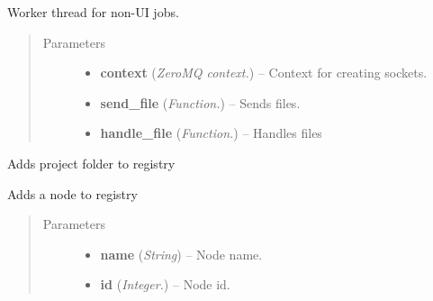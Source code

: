 \documentclass[letterpaper,10pt,english]{sphinxmanual}
\begin{document}
\begin{fulllineitems}
\label{api:wos.WORKER_THREAD}
Worker thread for non-UI jobs.
\begin{quote}\begin{description}
\item[{Parameters}] \leavevmode\begin{itemize}
\item {} 
\textbf{context} (\emph{ZeroMQ context.}) -- Context for creating sockets.

\item {} 
\textbf{send\_file} (\emph{Function.}) -- Sends files.

\item {} 
\textbf{handle\_file} (\emph{Function.}) -- Handles files

\end{itemize}

\end{description}\end{quote}

\begin{fulllineitems}
\label{api:wos.WORKER_THREAD.AddProjectReg}
Adds project folder to registry

\end{fulllineitems}


\begin{fulllineitems}
\label{api:wos.WORKER_THREAD.AddRegEntry}
Adds a node to registry
\begin{quote}\begin{description}
\item[{Parameters}] \leavevmode\begin{itemize}
\item {} 
\textbf{name} (\emph{String}) -- Node name.

\item {} 
\textbf{id} (\emph{Integer.}) -- Node id.

\end{itemize}

\end{description}\end{quote}


\end{fulllineitems}
\end{fulllineitems}
\end{document}
